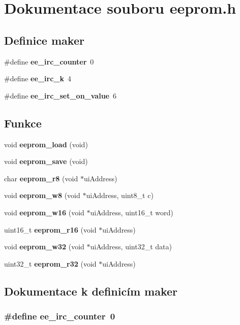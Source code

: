 \section{Dokumentace souboru eeprom.h}
\label{eeprom_8h}
\subsection*{Definice maker}
\begin{CompactItemize}
\item 
\#define {\bf ee\_\-irc\_\-counter}~0
\item 
\#define {\bf ee\_\-irc\_\-k}~4
\item 
\#define {\bf ee\_\-irc\_\-set\_\-on\_\-value}~6
\end{CompactItemize}
\subsection*{Funkce}
\begin{CompactItemize}
\item 
void {\bf eeprom\_\-load} (void)
\item 
void {\bf eeprom\_\-save} (void)
\item 
char {\bf eeprom\_\-r8} (void $\ast$uiAddress)
\item 
void {\bf eeprom\_\-w8} (void $\ast$uiAddress, uint8\_\-t c)
\item 
void {\bf eeprom\_\-w16} (void $\ast$uiAddress, uint16\_\-t word)
\item 
uint16\_\-t {\bf eeprom\_\-r16} (void $\ast$uiAddress)
\item 
void {\bf eeprom\_\-w32} (void $\ast$uiAddress, uint32\_\-t data)
\item 
uint32\_\-t {\bf eeprom\_\-r32} (void $\ast$uiAddress)
\end{CompactItemize}


\subsection{Dokumentace k definicím maker}
\subsubsection{\setlength{\rightskip}{0pt plus 5cm}\#define ee\_\-irc\_\-counter~0}\label{eeprom_8h_7e7f16f7f5faef1189e2c269718a8366}


